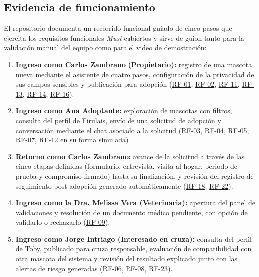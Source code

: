 \documentclass[journal,onecolumn]{IEEEtran}
\begin{document}
	\subsection{Evidencia de funcionamiento}
	\label{sec:mvp-evidencia}
	
	El repositorio documenta un recorrido funcional guiado de cinco pasos que
	ejercita los requisitos funcionales \emph{Must} cubiertos y sirve de guion
	tanto para la validación manual del equipo como para el video de
	demostración:
	
	\begin{enumerate}[leftmargin=*]
		\item \textbf{Ingreso como Carlos Zambrano (Propietario):} registro de
		una mascota nueva mediante el asistente de cuatro pasos, configuración
		de la privacidad de sus campos sensibles y publicación para adopción
		(\hyperref[tab:RF-01]{RF-01}, \hyperref[tab:RF-02]{RF-02}, \hyperref[tab:RF-11]{RF-11}, \hyperref[tab:RF-13]{RF-13}, \hyperref[tab:RF-14]{RF-14}, \hyperref[tab:RF-16]{RF-16}).
		\item \textbf{Ingreso como Ana Adoptante:} exploración de mascotas con
		filtros, consulta del perfil de Firulais, envío de una solicitud de
		adopción y conversación mediante el chat asociado a la solicitud
		(\hyperref[tab:RF-03]{RF-03}, \hyperref[tab:RF-04]{RF-04}, \hyperref[tab:RF-05]{RF-05}, \hyperref[tab:RF-07]{RF-07}, \hyperref[tab:RF-12]{RF-12} en su forma simulada).
		\item \textbf{Retorno como Carlos Zambrano:} avance de la solicitud a
		través de las cinco etapas definidas (formulario, entrevista, visita al
		hogar, periodo de prueba y compromiso firmado) hasta su finalización, y
		revisión del registro de seguimiento post-adopción generado
		automáticamente (\hyperref[tab:RF-18]{RF-18}, \hyperref[tab:RF-22]{RF-22}).
		\item \textbf{Ingreso como la Dra. Melissa Vera (Veterinaria):}
		apertura del panel de validaciones y resolución de un documento médico
		pendiente, con opción de validarlo o rechazarlo (\hyperref[tab:RF-09]{RF-09}).
		\item \textbf{Ingreso como Jorge Intriago (Interesado en cruza):}
		consulta del perfil de Toby, publicado para cruza responsable,
		evaluación de compatibilidad con otra mascota del sistema y revisión
		del resultado explicado junto con las alertas de riesgo generadas
		(\hyperref[tab:RF-06]{RF-06}, \hyperref[tab:RF-08]{RF-08}, \hyperref[tab:RF-23]{RF-23}).
	\end{enumerate}
	
\end{document}
